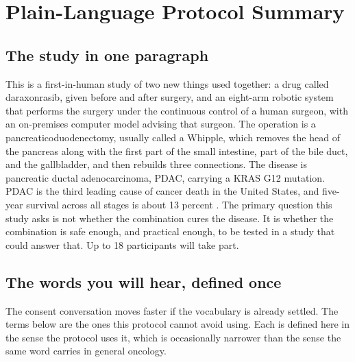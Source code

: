 \section{Plain-Language Protocol Summary}

\subsection{The study in one paragraph}

This is a first-in-human study of two new things used together: a drug called
daraxonrasib, given before and after surgery, and an eight-arm robotic system
that performs the surgery under the continuous control of a human surgeon, with
an on-premises computer model advising that surgeon. The operation is a
pancreaticoduodenectomy, usually called a Whipple, which removes the head of the
pancreas along with the first part of the small intestine, part of the bile
duct, and the gallbladder, and then rebuilds three connections. The disease is
pancreatic ductal adenocarcinoma, PDAC, carrying a KRAS G12 mutation. PDAC is
the third leading cause of cancer death in the United States, and five-year
survival across all stages is about 13 percent \cite{Siegel2025}. The primary
question this study asks is not whether the combination cures the disease. It is
whether the combination is safe enough, and practical enough, to be tested in a
study that could answer that. Up to 18 participants will take part.

\subsection{The words you will hear, defined once}

The consent conversation moves faster if the vocabulary is already settled. The
terms below are the ones this protocol cannot avoid using. Each is defined here
in the sense the protocol uses it, which is occasionally narrower than the sense
the same word carries in general oncology.

\vspace{0.30em}

